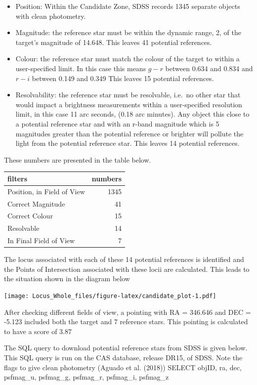 \documentclass[]{elsarticle} %
\providecommand{\tightlist}{%
  \setlength{\itemsep}{0pt}\setlength{\parskip}{0pt}}
\begin{document}
\begin{itemize}
\tightlist
\item
  Position: Within the Candidate Zone, SDSS records 1345 separate
  objects with clean photometry.
\item
  Magnitude: the reference star must be within the dynamic range, 2, of
  the target's magnitude of 14.648. This leaves 41 potential references.
\item
  Colour: the reference star must match the colour of the target to
  within a user-specified limit. In this case this means \(g - r\)
  between 0.634 and 0.834 and \(r - i\) between 0.149 and 0.349 This
  leaves 15 potential references.
\item
  Resolvability: the reference star must be resolvable, i.e.~no other
  star that would impact a brightness measurements within a
  user-specified resolution limit, in this case 11 arc seconds, (0.18
  arc minutes). Any object this close to a potential reference star and
  with an r-band magnitude which is 5 magnitudes greater than the
  potential reference or brighter will pollute the light from the
  potential reference star. This leaves 14 potential references.
\end{itemize}

These numbers are presented in the table below.

\begin{longtable}[]{@{}lr@{}}
\toprule
filters & numbers\tabularnewline
\midrule
\endhead
Position, in Field of View & 1345\tabularnewline
Correct Magnitude & 41\tabularnewline
Correct Colour & 15\tabularnewline
Resolvable & 14\tabularnewline
In Final Field of View & 7\tabularnewline
\bottomrule
\end{longtable}

\newpage

The locus associated with each of these 14 potential references is
identified and the Points of Intersection associated with these locii
are calculated. This leads to the situation shown in the diagram below

\texttt{[image: Locus\_Whole\_files/figure-latex/candidate\_plot-1.pdf]}

After checking different fields of view, a pointing with RA = 346.646
and DEC = -5.123 included both the target and 7 reference stars. This
pointing is calculated to have a score of 3.87 \newpage

The SQL query to download potential reference stars from SDSS is given
below. This SQL query is run on the CAS database, release DR15, of SDSS.
Note the flags to give clean photometry (Aguado et al. (2018))
\vskip 0.2in \noindent SELECT objID, ra, dec, psfmag\_u, psfmag\_g,
psfmag\_r, psfmag\_i, psfmag\_z
\end{document}
